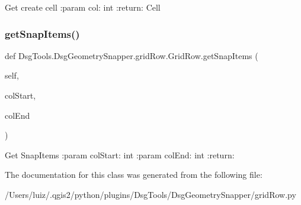 \begin{DoxyVerb}Get create cell
:param col: int
:return: Cell
\end{DoxyVerb}
 \mbox{\label{class_dsg_tools_1_1_dsg_geometry_snapper_1_1grid_row_1_1_grid_row_a7b4d350e82484115c560ac406bacd9c8}} 
\subsubsection{\texorpdfstring{get\+Snap\+Items()}{getSnapItems()}}
{\footnotesize\ttfamily def Dsg\+Tools.\+Dsg\+Geometry\+Snapper.\+grid\+Row.\+Grid\+Row.\+get\+Snap\+Items (\begin{DoxyParamCaption}\item[{}]{self,  }\item[{}]{col\+Start,  }\item[{}]{col\+End }\end{DoxyParamCaption})}

\begin{DoxyVerb}Get SnapItems
:param colStart: int
:param colEnd: int
:return:
\end{DoxyVerb}
 

The documentation for this class was generated from the following file\+:\begin{DoxyCompactItemize}
\item 
/\+Users/luiz/.\+qgis2/python/plugins/\+Dsg\+Tools/\+Dsg\+Geometry\+Snapper/grid\+Row.\+py\end{DoxyCompactItemize}
